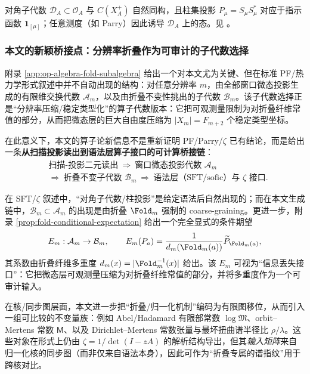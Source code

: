 \begin{remark}\label{prop:ck-diagonal-cylinders}
对角子代数 \(\mathcal{D}_A\subset\mathcal{O}_A\) 与 \(C(X_A^+)\) 自然同构，且柱集投影 \(P_\mu=S_\mu S_\mu^*\) 对应于指示函数 \(\mathbf{1}_{[\mu]}\)；任意测度（如 Parry）因此诱导 \(\mathcal{D}_A\) 上的态。见 \cite{CuntzKrieger1980}。
\end{remark}

\subsubsection{本文的新颖桥接点：分辨率折叠作为可审计的子代数选择}

附录 \ref{app:op-algebra-fold-subalgebra} 给出一个对本文尤为关键、但在标准 PF/热力学形式叙述中并不自动出现的结构：对任意分辨率 $m$，由全部窗口微态投影生成的有限维交换代数 $\mathcal{A}_m$，以及由折叠不变性挑出的子代数 $\mathcal{B}_m$。该子代数选择正是“分辨率压缩/稳定类型化”的算子代数版本：它把可观测量限制为对折叠纤维常值的部分，从而把微态层的巨大自由度压缩为 $|X_m|=F_{m+2}$ 个稳定类型坐标。\par
在此意义下，本文的算子论新信息不是重新证明 PF/Parry/$\zeta$ 已有结论，而是给出一条\textbf{从扫描投影读出到语法层算子接口的可计算桥接链}：
\[
\begin{aligned}
&\text{扫描-投影二元读出}\ \Rightarrow\ \text{窗口微态投影代数 }\mathcal{A}_m\\
&\Rightarrow\ \text{折叠不变子代数 }\mathcal{B}_m\ \Rightarrow\ \text{语法层（SFT/sofic）与 }\zeta\text{ 接口}.
\end{aligned}
\]

\begin{remark}\label{rem:fold-new-invariants}
在 SFT/\(\zeta\) 叙述中，“对角子代数/柱投影”是给定语法后自然出现的；而在本文生成链中，\(\mathcal{B}_m\subset\mathcal{A}_m\) 的出现是由折叠 \(\Fold_m\) 强制的 coarse-graining。更进一步，附录 \ref{prop:fold-conditional-expectation} 给出一个完全显式的条件期望
\[
E_m:\mathcal{A}_m\to\mathcal{B}_m,\qquad
E_m(P_a)=\frac{1}{d_m(\Fold_m(a))}\widetilde P_{\Fold_m(a)},
\]
其系数由折叠纤维多重度 \(d_m(x)=|\Fold_m^{-1}(x)|\) 给出。该 \(E_m\) 可视为“信息丢失接口”：它把微态层可观测量压缩为对折叠纤维常值的部分，并将多重度作为一个可审计输入。

在核/同步图层面，本文进一步把“折叠/归一化机制”编码为有限图移位，从而引入一组可比较的不变量族：例如 Abel/Hadamard 有限部常数 \(\log\mathfrak{M}\)、orbit--Mertens 常数 \(\mathsf{M}\)、以及 Dirichlet--Mertens 常数张量与最坏扭曲谱半径比 \(\rho/\lambda\)。这些对象在形式上仍由 \(\zeta=1/\det(I-zA)\) 的解析结构导出，但其\emph{输入矩阵}来自归一化核的同步图（而非仅来自语法本身），因此可作为“折叠专属的谱指纹”用于跨核对比。
\end{remark}
